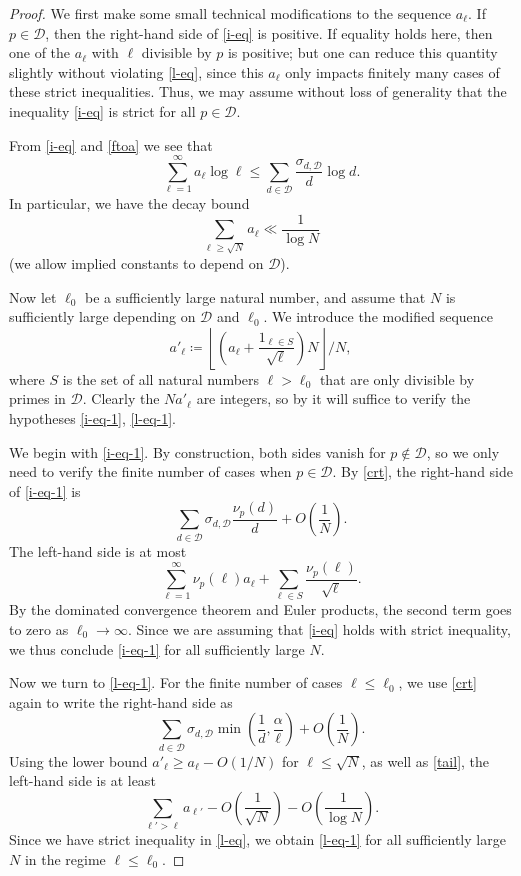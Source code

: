 \documentclass[10pt,a4paper,reqno]{amsart}
\numberwithin{equation}{section}
\theoremstyle{plain}
\theoremstyle{definition}
\begin{document}
\begin{proof}  We first make some small technical modifications to the sequence $a_\ell$. If $p \in {\mathcal D}$, then the right-hand side of \eqref{i-eq} is positive.  If equality holds here, then one of the $a_\ell$ with $\ell$ divisible by $p$ is positive; but one can reduce this quantity slightly without violating \eqref{l-eq}, since this $a_\ell$ only impacts finitely many cases of these strict inequalities.  Thus, we may assume without loss of generality that the inequality \eqref{i-eq} is strict for all $p \in {\mathcal D}$.

From \eqref{i-eq} and \eqref{ftoa} we see that
$$ \sum_{\ell=1}^\infty a_\ell \log \ell \leq \sum_{d \in {\mathcal D}} \frac{\sigma_{d,{\mathcal D}}}{d} \log d.$$
In particular, we have the decay bound
\begin{equation}\label{tail}
  \sum_{\ell \geq \sqrt{N}} a_\ell \ll \frac{1}{\log N}
\end{equation}
(we allow implied constants to depend on ${\mathcal D}$).

Now let $\ell_0$ be a sufficiently large natural number, and assume that $N$ is sufficiently large depending on ${\mathcal D}$ and $\ell_0$.  We introduce the modified sequence
$$ a'_\ell \coloneqq \left\lfloor \left(a_\ell + \frac{1_{\ell \in S}}{\sqrt{\ell}}\right) N \right\rfloor / N,$$
where $S$ is the set of all natural numbers $\ell > \ell_0$ that are only divisible by primes in ${\mathcal D}$.
Clearly the $N a'_\ell$ are integers, so by  it will suffice to verify the hypotheses \eqref{i-eq-1}, \eqref{l-eq-1}.

We begin with \eqref{i-eq-1}.  By construction, both sides vanish for $p \not \in {\mathcal D}$, so we only need to verify the finite number of cases when $p \in {\mathcal D}$.  By \eqref{crt}, the right-hand side of \eqref{i-eq-1} is 
$$ \sum_{d \in {\mathcal D}} \sigma_{d,{\mathcal D}} \frac{\nu_p(d)}{d} + O\left(\frac{1}{N} \right).$$
The left-hand side is at most
$$ \sum_{\ell=1}^\infty \nu_p(\ell) a_\ell + \sum_{\ell \in S} \frac{\nu_p(\ell)}{\sqrt{\ell}}.$$
By the dominated convergence theorem and Euler products, the second term goes to zero as $\ell_0 \to \infty$.  Since we are assuming that \eqref{i-eq} holds with strict inequality, we thus conclude \eqref{i-eq-1} for all sufficiently large $N$.

Now we turn to \eqref{l-eq-1}.  For the finite number of cases $\ell \leq \ell_0$, we use \eqref{crt} again to write the right-hand side as
$$ \sum_{d \in {\mathcal D}} \sigma_{d,{\mathcal D}} \min\left( \frac{1}{d}, \frac{\alpha}{\ell}\right) + O\left(\frac{1}{N} \right).$$
Using the lower bound $a'_\ell \geq a_\ell - O(1/N)$ for $\ell \leq \sqrt{N}$, as well as \eqref{tail}, the left-hand side is at least
$$ \sum_{\ell' > \ell} a_{\ell'} - O\left(\frac{1}{\sqrt{N}} \right) - O\left(\frac{1}{\log N} \right).$$
Since we have strict inequality in \eqref{l-eq}, we obtain \eqref{l-eq-1} for all sufficiently large $N$ in the regime $\ell \leq \ell_0$.


\end{proof}
\end{document}
